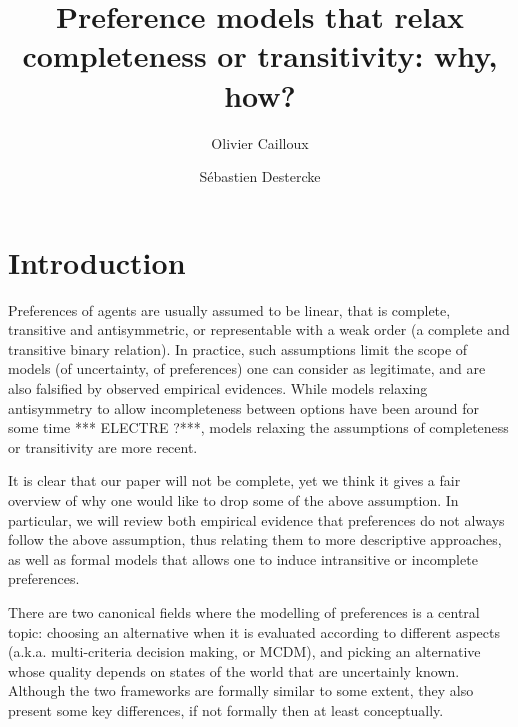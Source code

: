 \documentclass[french, english]{llncs}
\begin{document}
	\title{Preference models that relax completeness or transitivity: why, how?}
	\author{Olivier Cailloux \and Sébastien Destercke}
	\maketitle
	
	
	\setlength{\parindent}{1.5em}
	
	\section{Introduction}\label{sec:intro}
	Preferences of agents are usually assumed to be linear, that is complete, transitive and antisymmetric, or representable with a weak order (a complete and transitive binary relation). In practice, such assumptions limit the scope of models (of uncertainty, of preferences) one can consider as legitimate, and are also falsified by observed empirical evidences. While models relaxing antisymmetry to allow incompleteness between options have been around for some time *** ELECTRE ?***, models relaxing the assumptions of completeness or transitivity are more recent.
	
	It is clear that our paper will not be complete, yet we think it gives a fair overview of why one would like to drop some of the above assumption. In particular, we will review both empirical evidence that preferences do not always follow the above assumption, thus relating them to more descriptive approaches, as well as formal  models that allows one to induce intransitive or incomplete preferences. 
	
	There are two canonical fields where the modelling of preferences is a central topic: choosing an alternative when it is evaluated according to different aspects (a.k.a. multi-criteria decision making, or MCDM), and picking an alternative whose quality depends on states of the world that are uncertainly known. Although the two frameworks are formally similar to some extent, they also present some key differences, if not formally then at least conceptually. 
	
\end{document}
